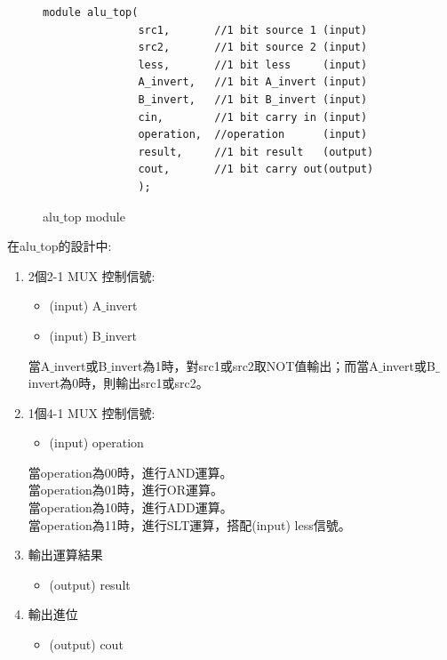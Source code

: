 \documentclass[12pt,a4paper]{article}
\theoremstyle{definition}
\begin{document}
\begin{figure}[H]
\centering
\begin{lstlisting}[caption={}]
module alu_top(
               src1,       //1 bit source 1 (input)
               src2,       //1 bit source 2 (input)
               less,       //1 bit less     (input)
               A_invert,   //1 bit A_invert (input)
               B_invert,   //1 bit B_invert (input)
               cin,        //1 bit carry in (input)
               operation,  //operation      (input)
               result,     //1 bit result   (output)
               cout,       //1 bit carry out(output)
               );
\end{lstlisting}
\caption{alu$\_$top module}
\label{fig:alu_top_}
\end{figure}


在alu$\_$top的設計中:
\begin{enumerate}
\item 2個2-1 MUX 控制信號:
\begin{itemize}
\item (input) A$\_$invert
\item (input) B$\_$invert
\end{itemize}
當A$\_$invert或B$\_$invert為1時，對src1或src2取NOT值輸出；而當A$\_$invert或B$\_$invert為0時，則輸出src1或src2。

\item 1個4-1 MUX 控制信號:
\begin{itemize}
\item (input) operation
\end{itemize}
當operation為00時，進行AND運算。\\
當operation為01時，進行OR運算。\\
當operation為10時，進行ADD運算。\\
當operation為11時，進行SLT運算，搭配(input) less信號。

\item 輸出運算結果
\begin{itemize}
\item (output) result
\end{itemize}

\item 輸出進位
\begin{itemize}
\item (output) cout
\end{itemize}
\end{enumerate}
\end{document}
